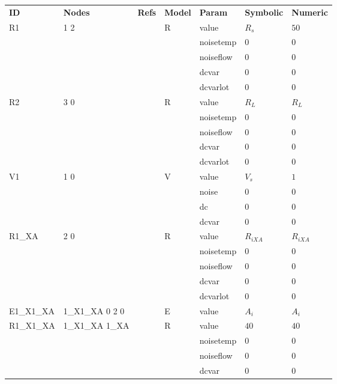 \begin{table}[H]
\centering
\begin{tabular}[c]{lllllll}
\textbf{ID} & \textbf{Nodes} & \textbf{Refs} & \textbf{Model} & \textbf{Param} & \textbf{Symbolic} & \textbf{Numeric} \\ 
\rowcolor{myyellow}
\small{R1} &\small{1 2 } & &\small{R} &\small{value} &$R_{s}$ &$50$ \\ 
 & & & &\small{noisetemp} &$0$ &$0$ \\ 
\rowcolor{myyellow}
 & & & &\small{noiseflow} &$0$ &$0$ \\ 
 & & & &\small{dcvar} &$0$ &$0$ \\ 
\rowcolor{myyellow}
 & & & &\small{dcvarlot} &$0$ &$0$ \\ 
\small{R2} &\small{3 0 } & &\small{R} &\small{value} &$R_{L}$ &$R_{L}$ \\ 
\rowcolor{myyellow}
 & & & &\small{noisetemp} &$0$ &$0$ \\ 
 & & & &\small{noiseflow} &$0$ &$0$ \\ 
\rowcolor{myyellow}
 & & & &\small{dcvar} &$0$ &$0$ \\ 
 & & & &\small{dcvarlot} &$0$ &$0$ \\ 
\rowcolor{myyellow}
\small{V1} &\small{1 0 } & &\small{V} &\small{value} &$V_{s}$ &$1$ \\ 
 & & & &\small{noise} &$0$ &$0$ \\ 
\rowcolor{myyellow}
 & & & &\small{dc} &$0$ &$0$ \\ 
 & & & &\small{dcvar} &$0$ &$0$ \\ 
\rowcolor{myyellow}
\small{R1\_XA} &\small{2 0 } & &\small{R} &\small{value} &$R_{i XA}$ &$R_{i XA}$ \\ 
 & & & &\small{noisetemp} &$0$ &$0$ \\ 
\rowcolor{myyellow}
 & & & &\small{noiseflow} &$0$ &$0$ \\ 
 & & & &\small{dcvar} &$0$ &$0$ \\ 
\rowcolor{myyellow}
 & & & &\small{dcvarlot} &$0$ &$0$ \\ 
\small{E1\_X1\_XA} &\small{1\_X1\_XA 0 2 0 } & &\small{E} &\small{value} &$A_{i}$ &$A_{i}$ \\ 
\rowcolor{myyellow}
\small{R1\_X1\_XA} &\small{1\_X1\_XA 1\_XA } & &\small{R} &\small{value} &$40$ &$40$ \\ 
 & & & &\small{noisetemp} &$0$ &$0$ \\ 
\rowcolor{myyellow}
 & & & &\small{noiseflow} &$0$ &$0$ \\ 
 & & & &\small{dcvar} &$0$ &$0$ \\ 

\end{tabular}
\end{table}
